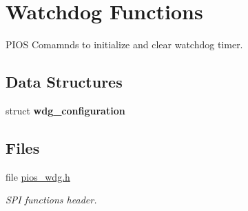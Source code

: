 \hypertarget{group___p_i_o_s___w_d_g}{\section{\-Watchdog \-Functions}
\label{group___p_i_o_s___w_d_g}
}


\-P\-I\-O\-S \-Comamnds to initialize and clear watchdog timer.  


\subsection*{\-Data \-Structures}
\begin{DoxyCompactItemize}
\item 
struct {\bfseries wdg\-\_\-configuration}
\end{DoxyCompactItemize}
\subsection*{\-Files}
\begin{DoxyCompactItemize}
\item 
file \hyperlink{pios__wdg_8h}{pios\-\_\-wdg.\-h}
\begin{DoxyCompactList}\small\item\em \-S\-P\-I functions header. \end{DoxyCompactList}\end{DoxyCompactItemize}
